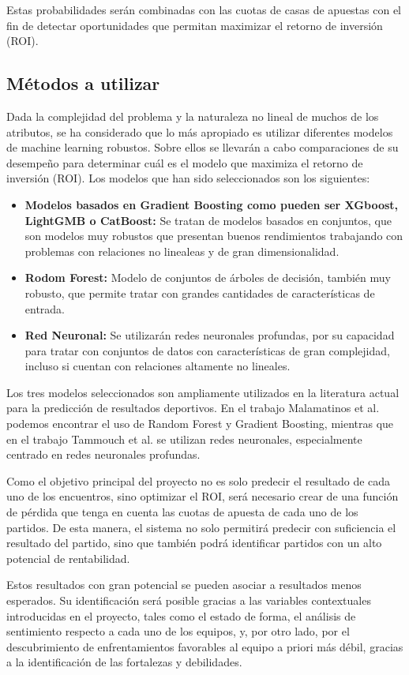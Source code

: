 Estas probabilidades serán combinadas con las cuotas de casas de apuestas con el fin de detectar oportunidades que permitan maximizar el retorno de inversión (ROI).

\subsection{Métodos a utilizar}

Dada la complejidad del problema y la naturaleza no lineal de muchos de los atributos, se ha considerado que lo más apropiado es utilizar diferentes modelos de machine learning robustos. Sobre ellos se llevarán a cabo comparaciones de su desempeño para determinar cuál es el modelo que maximiza el retorno de inversión (ROI). Los modelos que han sido seleccionados son los siguientes:

\begin{itemize}
    \item \textbf{Modelos basados en Gradient Boosting como pueden ser XGboost, LightGMB o CatBoost:} Se tratan de modelos basados en conjuntos, que son modelos muy robustos que presentan buenos rendimientos trabajando con problemas con relaciones no linealeas y de gran dimensionalidad.
    \item \textbf{Rodom Forest:} Modelo de conjuntos de árboles de decisión, también muy robusto, que permite tratar con grandes cantidades de características de entrada.
    \item \textbf{Red Neuronal:} Se utilizarán redes neuronales profundas, por su capacidad para tratar con conjuntos de datos con características de gran complejidad, incluso si cuentan con relaciones altamente no lineales.
\end{itemize}

Los tres modelos seleccionados son ampliamente utilizados en la literatura actual para la predicción de resultados deportivos. En el trabajo Malamatinos et al. \cite{Malamatinos2022GreekLeague} podemos encontrar el uso de Random Forest y Gradient Boosting, mientras que en el trabajo Tammouch et al. \cite{Tammouch2024BettingML} se utilizan redes neuronales, especialmente centrado en redes neuronales profundas.

Como el objetivo principal del proyecto no es solo predecir el resultado de cada uno de los encuentros, sino optimizar el ROI, será necesario crear de una función de pérdida que tenga en cuenta las cuotas de apuesta de cada uno de los partidos. De esta manera, el sistema no solo permitirá predecir con suficiencia el resultado del partido, sino que también podrá identificar partidos con un alto potencial de rentabilidad.

Estos resultados con gran potencial se pueden asociar a resultados menos esperados. Su identificación será posible gracias a las variables contextuales introducidas en el proyecto, tales como el estado de forma, el análisis de sentimiento respecto a cada uno de los equipos, y, por otro lado, por el descubrimiento de enfrentamientos favorables al equipo a priori más débil, gracias a la identificación de las fortalezas y debilidades.